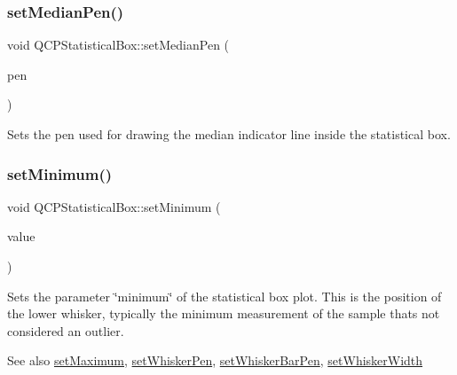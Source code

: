 \subsubsection{\texorpdfstring{set\+Median\+Pen()}{setMedianPen()}}
{\footnotesize\ttfamily void Q\+C\+P\+Statistical\+Box\+::set\+Median\+Pen (\begin{DoxyParamCaption}\item[{const Q\+Pen \&}]{pen }\end{DoxyParamCaption})}

Sets the pen used for drawing the median indicator line inside the statistical box. \mbox{\label{class_q_c_p_statistical_box_a84ff7cc61ba44890f0c3e0c99c19941e}} 
\subsubsection{\texorpdfstring{set\+Minimum()}{setMinimum()}}
{\footnotesize\ttfamily void Q\+C\+P\+Statistical\+Box\+::set\+Minimum (\begin{DoxyParamCaption}\item[{double}]{value }\end{DoxyParamCaption})}

Sets the parameter \char`\"{}minimum\char`\"{} of the statistical box plot. This is the position of the lower whisker, typically the minimum measurement of the sample that\textquotesingle{}s not considered an outlier.

\begin{DoxySeeAlso}{See also}
\mbox{\hyperlink{class_q_c_p_statistical_box_acec5ad1901f00f2c5387cfb4d9787eb3}{set\+Maximum}}, \mbox{\hyperlink{class_q_c_p_statistical_box_a4a5034cb3b9b040444df05ab1684620b}{set\+Whisker\+Pen}}, \mbox{\hyperlink{class_q_c_p_statistical_box_aa8d3e503897788e1abf68dc74b5f147f}{set\+Whisker\+Bar\+Pen}}, \mbox{\hyperlink{class_q_c_p_statistical_box_adf378812446bd66f34d1f7f293d991cd}{set\+Whisker\+Width}} 
\end{DoxySeeAlso}
\mbox{\label{class_q_c_p_statistical_box_af9bc09620e0bf93bf444ee35e5800d1d}} 
